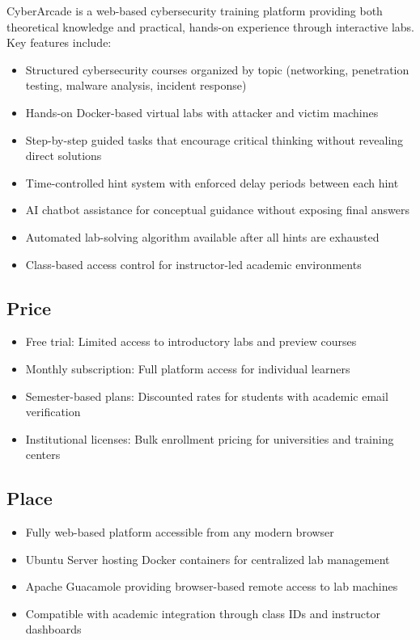 \documentclass[12pt,a4paper]{report}
\begin{document}
CyberArcade is a web-based cybersecurity training platform providing both theoretical knowledge and
practical, hands-on experience through interactive labs. Key features include:
\begin{itemize}
  \item Structured cybersecurity courses organized by topic (networking, penetration testing, malware analysis, incident response)
  \item Hands-on Docker-based virtual labs with attacker and victim machines
  \item Step-by-step guided tasks that encourage critical thinking without revealing direct solutions
  \item Time-controlled hint system with enforced delay periods between each hint
  \item AI chatbot assistance for conceptual guidance without exposing final answers
  \item Automated lab-solving algorithm available after all hints are exhausted
  \item Class-based access control for instructor-led academic environments
\end{itemize}

\subsection{Price}
\begin{itemize}
  \item Free trial: Limited access to introductory labs and preview courses
  \item Monthly subscription: Full platform access for individual learners
  \item Semester-based plans: Discounted rates for students with academic email verification
  \item Institutional licenses: Bulk enrollment pricing for universities and training centers
\end{itemize}

\subsection{Place}
\begin{itemize}
  \item Fully web-based platform accessible from any modern browser
  \item Ubuntu Server hosting Docker containers for centralized lab management
  \item Apache Guacamole providing browser-based remote access to lab machines
  \item Compatible with academic integration through class IDs and instructor dashboards
\end{itemize}
\end{document}
